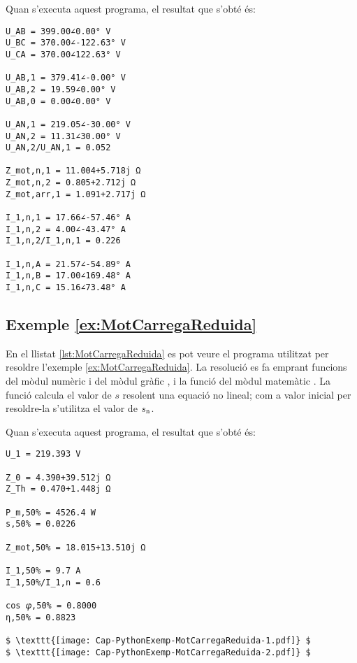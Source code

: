 Quan s'executa aquest programa, el resultat que s'obté és:
\lstset{
	language=,
	numbers=none,
	frame=none
}
\begin{lstlisting}
U_AB = 399.00∠0.00° V
U_BC = 370.00∠-122.63° V
U_CA = 370.00∠122.63° V

U_AB,1 = 379.41∠-0.00° V
U_AB,2 = 19.59∠0.00° V
U_AB,0 = 0.00∠0.00° V

U_AN,1 = 219.05∠-30.00° V
U_AN,2 = 11.31∠30.00° V
U_AN,2/U_AN,1 = 0.052

Z_mot,n,1 = 11.004+5.718j Ω
Z_mot,n,2 = 0.805+2.712j Ω
Z_mot,arr,1 = 1.091+2.717j Ω

I_1,n,1 = 17.66∠-57.46° A
I_1,n,2 = 4.00∠-43.47° A
I_1,n,2/I_1,n,1 = 0.226

I_1,n,A = 21.57∠-54.89° A
I_1,n,B = 17.00∠169.48° A
I_1,n,C = 15.16∠73.48° A
\end{lstlisting} 


\hypertarget{exemple:MotCarregaReduida}{\subsection{Exemple \ref*{ex:MotCarregaReduida} \MotCarregaReduida}}
En el llistat \vref{lst:MotCarregaReduida} es pot veure el programa utilitzat per resoldre l'exemple \vref{ex:MotCarregaReduida}. La resolució es fa emprant funcions del mòdul numèric  i del mòdul gràfic , i la funció  del mòdul matemàtic . La funció  calcula el valor de $s$ resolent una equació no lineal; com a valor inicial per resoldre-la  s'utilitza el valor de $s_\mathrm{n}$.


Quan s'executa aquest programa, el resultat que s'obté és:
\lstset{
	language=,
	numbers=none,
	frame=none
}
\begin{lstlisting}[mathescape=true]
U_1 = 219.393 V

Z_0 = 4.390+39.512j Ω
Z_Th = 0.470+1.448j Ω

P_m,50% = 4526.4 W
s,50% = 0.0226

Z_mot,50% = 18.015+13.510j Ω

I_1,50% = 9.7 A
I_1,50%/I_1,n = 0.6

cos 𝜑,50% = 0.8000
η,50% = 0.8823

$ \texttt{[image: Cap-PythonExemp-MotCarregaReduida-1.pdf]} $
$ \texttt{[image: Cap-PythonExemp-MotCarregaReduida-2.pdf]} $
\end{lstlisting} 


